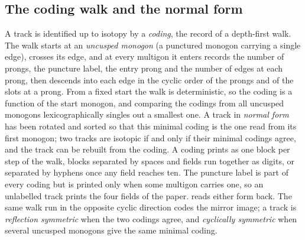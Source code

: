 \documentclass[12pt]{amsart}
\theoremstyle{plain}
\theoremstyle{definition}
\begin{document}
\subsection{The coding walk and the normal form}
\label{sec:coding}
A track is identified up to isotopy by a \emph{coding}, the record of a
depth-first walk.  The walk starts at an \emph{uncusped monogon} (a
punctured monogon carrying a single edge), crosses its edge, and at every
multigon it enters records the number of prongs, the puncture label, the
entry prong and the number of edges at each prong, then descends into
each edge in the cyclic order of the prongs and of the slots at a prong.
From a fixed start the walk is deterministic, so the coding is a function
of the start monogon, and comparing the codings from all uncusped
monogons lexicographically singles out a smallest one.  A track in
\emph{normal form} has been rotated and sorted so that this minimal
coding is the one read from its first monogon; two tracks are isotopic if
and only if their minimal codings agree, and the track can be rebuilt
from the coding.  A coding prints as one block per step of the walk,
blocks separated by spaces and fields run together as digits, or
separated by hyphens once any field reaches ten.  The puncture label is
part of every coding but is printed only when some multigon carries one,
so an unlabelled track prints the four fields of the paper.
 reads either form back.  The same walk run in the
opposite cyclic direction
codes the mirror image; a track is \emph{reflection symmetric} when the
two codings agree, and \emph{cyclically symmetric} when several uncusped
monogons give the same minimal coding.
\end{document}
